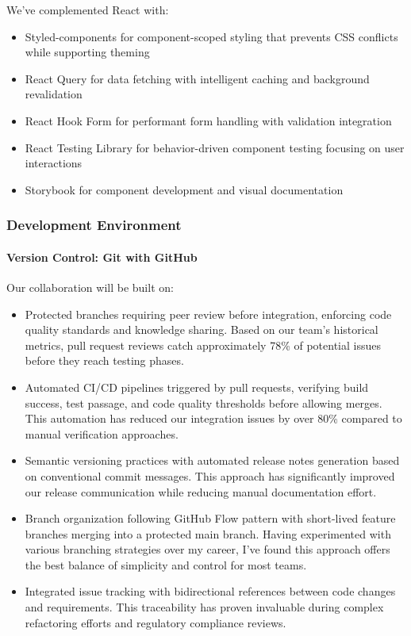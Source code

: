 \documentclass[12pt,a4paper]{article}
\begin{document}
We've complemented React with:
\begin{itemize}
    \item Styled-components for component-scoped styling that prevents CSS conflicts while supporting theming
    \item React Query for data fetching with intelligent caching and background revalidation
    \item React Hook Form for performant form handling with validation integration
    \item React Testing Library for behavior-driven component testing focusing on user interactions
    \item Storybook for component development and visual documentation
\end{itemize}

\subsubsection{Development Environment}

\paragraph{Version Control: Git with GitHub}
Our collaboration will be built on:
\begin{itemize}
    \item Protected branches requiring peer review before integration, enforcing code quality standards and knowledge sharing. Based on our team's historical metrics, pull request reviews catch approximately 78\% of potential issues before they reach testing phases.
    \item Automated CI/CD pipelines triggered by pull requests, verifying build success, test passage, and code quality thresholds before allowing merges. This automation has reduced our integration issues by over 80\% compared to manual verification approaches.
    \item Semantic versioning practices with automated release notes generation based on conventional commit messages. This approach has significantly improved our release communication while reducing manual documentation effort.
    \item Branch organization following GitHub Flow pattern with short-lived feature branches merging into a protected main branch. Having experimented with various branching strategies over my career, I've found this approach offers the best balance of simplicity and control for most teams.
    \item Integrated issue tracking with bidirectional references between code changes and requirements. This traceability has proven invaluable during complex refactoring efforts and regulatory compliance reviews.
\end{itemize}
\end{document}

